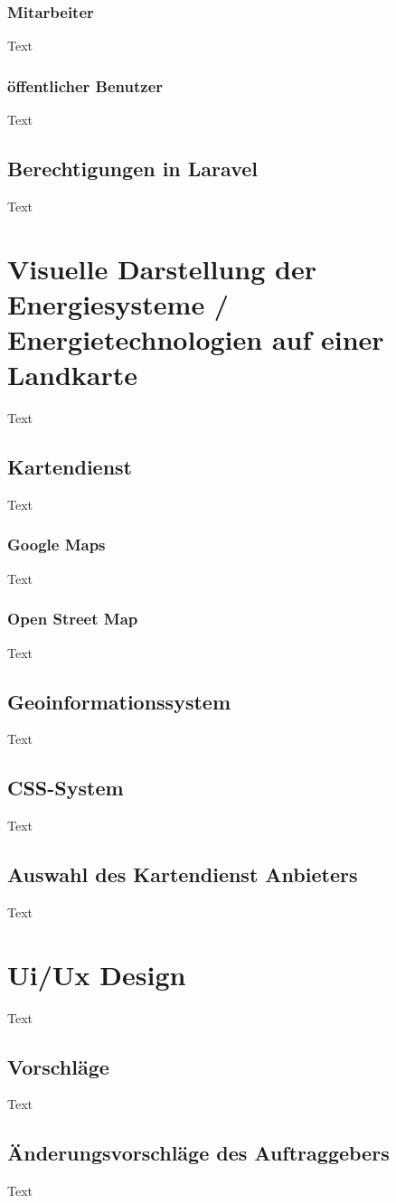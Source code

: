 \subsubsection{Mitarbeiter}
Text
\subsubsection{öffentlicher Benutzer}
Text
\subsection{Berechtigungen in Laravel}
Text



\section{Visuelle Darstellung der Energiesysteme / Energietechnologien auf einer Landkarte}
Text
\subsection{Kartendienst}
Text
\subsubsection{Google Maps}
Text
\subsubsection{Open Street Map}
Text
\subsection{Geoinformationssystem}
Text
\subsection{CSS-System}
Text
\subsection{Auswahl des Kartendienst Anbieters}
Text



\section{Ui/Ux Design}
Text
\subsection{Vorschläge}
Text
\subsection{Änderungsvorschläge des Auftraggebers }
Text

